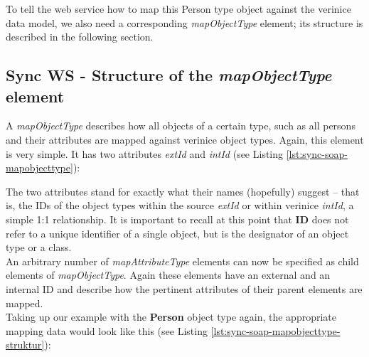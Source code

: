 \documentclass[a4paper,10pt]{book}
\begin{document}
To tell the web service how to map this Person type object against the verinice data model, we also need a corresponding
\textit{mapObjectType} element; its structure is described in the following section.

\subsection{Sync WS - Structure of the \textit{mapObjectType} element}
A \textit{mapObjectType} describes how all objects of a certain type, such as all persons and their attributes
are mapped against verinice object types. Again, this element is very simple. It has two attributes \textit{extId} and
\textit{intId} (see Listing \ref{lst:sync-soap-mapobjecttype}):
\newline

\lstset{language=XML}



The two attributes stand for exactly what their names (hopefully) suggest – that is, the IDs of
the object types within the source \textit{extId} or within verinice \textit{intId}, a simple 1:1 relationship.
It is important to recall at this point that \textbf{ID} does not refer to a unique identifier of a single object,
but is the designator of an object type or a class.
\newline\\
An arbitrary number of \textit{mapAttributeType} elements can now be specified as child elements of
\textit{mapObjectType}. Again these elements have an external and an internal ID and describe how
the pertinent attributes of their parent elements are mapped.
\newline\\
Taking up our example with the \textbf{Person} object type again, the appropriate mapping data would look like this (see Listing \ref{lst:sync-soap-mapobjecttype-struktur}):
\newline
\lstset{language=XML}

\end{document}
